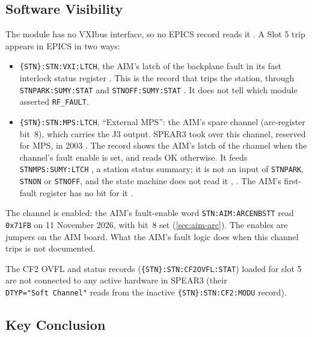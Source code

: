\subsection{Software Visibility}\label{sec:slot5-sw}


The module has no VXIbus interface, so no EPICS record reads it . A Slot 5 trip appears in EPICS in two ways:

\begin{itemize}
\tightlist
\item
  \texttt{\{STN\}:\allowbreak{}STN:\allowbreak{}VXI:\allowbreak{}LTCH}, the AIM's latch of the backplane fault in its fast interlock status register . This is the record that trips the station, through \texttt{STNPARK:\allowbreak{}SUMY:\allowbreak{}STAT} and \texttt{STNOFF:\allowbreak{}SUMY:\allowbreak{}STAT} . It does not tell which module asserted \texttt{RF\_FAULT}.
\item
  \texttt{\{STN\}:\allowbreak{}STN:\allowbreak{}MPS:\allowbreak{}LTCH}, ``External MPS'': the AIM's spare channel (arc-register bit~8), which carries the J3 output. SPEAR3 took over this channel, reserved for MPS, in 2003 . The record shows the AIM's latch of the channel when the channel's fault enable is set, and reads OK otherwise. It feeds \texttt{STNMPS:\allowbreak{}SUMY:\allowbreak{}LTCH} , a station status summary; it is not an input of \texttt{STNPARK}, \texttt{STNON} or \texttt{STNOFF}, and the state machine does not read it , . The AIM's first-fault register has no bit for it .
\end{itemize}

The channel is enabled: the AIM's fault-enable word \texttt{STN:\allowbreak{}AIM:\allowbreak{}ARCENBSTT} read \texttt{0x71FB} on 11 November 2026, with bit~8 set (\cref{sec:aim-arc}). The enables are jumpers on the AIM board. What the AIM's fault logic does when this channel trips is not documented.

The CF2 OVFL and status records (\texttt{\{STN\}:\allowbreak{}STN:\allowbreak{}CF2OVFL:\allowbreak{}STAT}) loaded for slot 5 are not connected to any active hardware in SPEAR3 (their \texttt{DTYP="Soft\ Channel"} reads from the inactive \texttt{\{STN\}:\allowbreak{}STN:\allowbreak{}CF2:\allowbreak{}MODU} record).

\subsection{Key Conclusion}\label{sec:slot5-conclusion}


